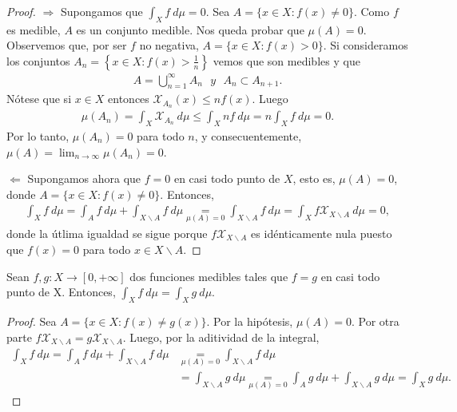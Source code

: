 \begin{proof}
    $\Longrightarrow$ Supongamos que $\int_{X}{f \ d\mu} = 0$. Sea $A = \{x \in X : f(x) \not = 0\}$. Como $f$ es medible, $A$ es un conjunto medible. Nos queda probar que $\mu(A) = 0$. Observemos que, por ser $f$ no negativa, $A = \{x \in X : f(x) > 0\}$. Si consideramos los conjuntos $A_n = \left\{x \in X : f(x) > \frac{1}{n}\right\}$ vemos que son medibles y que
    \begin{align*}
        A = \bigcup_{n=1}^{\infty}{A_n} \ \ \ y \ \ \ A_n \subset A_{n+1}.
    \end{align*}
    Nótese que si $x \in X$ entonces  $\mathcal{X}_{A_n}(x) \leq nf(x)$. Luego
    \begin{align*}
        \mu(A_n) = \int_{X}{\mathcal{X}_{A_n} \ d\mu} \leq \int_{X}{nf \ d\mu} = n\int_{X}{f \ d\mu} = 0.
    \end{align*}
    Por lo tanto, $\mu(A_n) = 0$ para todo $n$, y consecuentemente, $\mu(A) = \lim_{n \to \infty}{\mu(A_n)} = 0$.

    $\Longleftarrow$ Supongamos ahora que $f = 0$ en casi todo punto de $X$, esto es, $\mu(A) = 0$, donde $A = \{ x \in X : f(x) \not = 0\}$. Entonces,
    \begin{align*}
        \int_{X}{f \ d\mu} = \int_{A}{f \ d\mu} + \int_{X \backslash A}{f \ d\mu} \underset{\mu(A) = 0}{=} \int_{X \backslash A}{f \ d\mu} = \int_{X}{f\mathcal{X}_{X \backslash A} \ d\mu} = 0,
    \end{align*}
    donde la útlima igualdad se sigue porque $f \mathcal{X}_{X \backslash A}$ es idénticamente nula puesto que $f(x) = 0$ para todo $x \in X \backslash A$.
\end{proof}

\begin{prop}
    Sean $f,g: X \longrightarrow [0,+\infty]$ dos funciones medibles tales que $f = g$ en casi todo punto de X. Entonces, $\int_{X}{f \ d\mu} = \int_{X}{g \ d\mu}$.
\end{prop}

\begin{proof}
    Sea $A = \{ x \in X : f(x) \not = g(x)\}$. Por la hipótesis, $\mu(A) = 0$. Por otra parte $f\mathcal{X}_{X \backslash A} = g\mathcal{X}_{X \backslash A}$. Luego, por la aditividad de la integral,
    \begin{align*}
        \int_{X}{f \ d\mu}  = \int_{A}{f \ d\mu} + \int_{X \backslash A}{f \ d\mu} & \underset{\mu(A) = 0}{=} \int_{X \backslash A}{f \ d\mu}                                                                              \\
                                                                                   & = \int_{X \backslash A}{g \ d\mu} \underset{\mu(A) = 0}{=} \int_{A}{g \ d\mu} + \int_{X \backslash A}{g \ d\mu} = \int_{X}{g \ d\mu}.
    \end{align*}
\end{proof}


